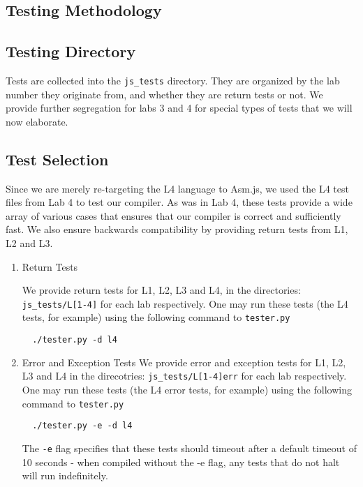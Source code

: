 \documentclass[twoside]{article}
\begin{document}
\begin{multicols}{2}

\section{Testing Methodology}

\subsection{Testing Directory}
Tests are collected into the \texttt{js\_tests} directory. They are organized
by the lab number they originate from, and whether they are return tests or not. 
We provide further segregation for labs 3 and 4 for special types of tests that
we will now elaborate. 

\subsection{Test Selection}
Since we are merely re-targeting the L4 language to Asm.js, we used the L4 test
files from Lab 4 to test our compiler. As was in Lab 4, these tests provide a
wide array of various cases that ensures that our compiler is correct and
sufficiently fast. We also ensure backwards compatibility by providing return
tests from L1, L2 and L3. 

\begin{enumerate}

  \item Return Tests

  We provide return tests for L1, L2, L3 and L4, in the directories: 
  \texttt{js\_tests/L[1-4]} for each lab respectively. One may run these 
  tests (the L4 tests, for example) using the following command to \texttt{tester.py}
\begin{verbatim}
  ./tester.py -d l4
\end{verbatim}

  \item Error and Exception Tests
  We provide error and exception tests for L1, L2, L3 and L4 in the direcotries:
  \texttt{js\_tests/L[1-4]err} for each lab respectively. One may run these
  tests (the L4 error tests, for example) using the following command to \texttt{tester.py}
\begin{verbatim}
  ./tester.py -e -d l4
\end{verbatim}
  The \texttt{-e} flag specifies that these tests should timeout after a default
  timeout of 10 seconds - when compiled without the -e flag, any tests that do not
  halt will run indefinitely. 


\end{enumerate}
\end{multicols}
\end{document}
